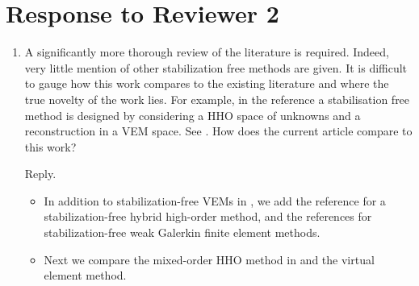 \documentclass[10pt]{amsart}
\theoremstyle{definition}
\theoremstyle{remark}
\begin{document}
\section{Response to Reviewer 2}

\begin{enumerate}[1.]
\item \textsf{A significantly more thorough review of the literature is required. Indeed, very little mention of other stabilization free methods are given. It is difficult to gauge how this work compares to the existing literature and where the true novelty of the work lies. For example, in the reference \cite{CicuttinErnLemaire2019} a stabilisation free method is designed by considering a HHO space of unknowns and a reconstruction in a VEM space. See \cite[Remark 5.1]{CicuttinErnLemaire2019}. How does the current article compare to this work?}

\smallskip \noindent \textcolor[rgb]{1.00,0.00,0.00}{Reply.}
\begin{itemize}
    \item In addition to stabilization-free VEMs in \cite{BerroneBorioMarcon2021,BerroneBorioMarcon2022,DAltriMirandaPatrunoSacco2021,ChenSukumar2022,ChenSukumar2023,MengWangBuMei2022}, we add the reference \cite{CicuttinErnLemaire2019} for a stabilization-free hybrid high-order method, and the references
\cite{YeZhang2020,AlTaweelWang2020,AlTaweelWang2020a,YeZhang2021,YeZhang2021a,AlTaweelWangYeZhang2021} for stabilization-free weak Galerkin finite element methods.
    \item Next we compare the mixed-order HHO method in \cite{CicuttinErnLemaire2019} and the virtual element method. 


\end{itemize}
\end{enumerate}
\end{document}
